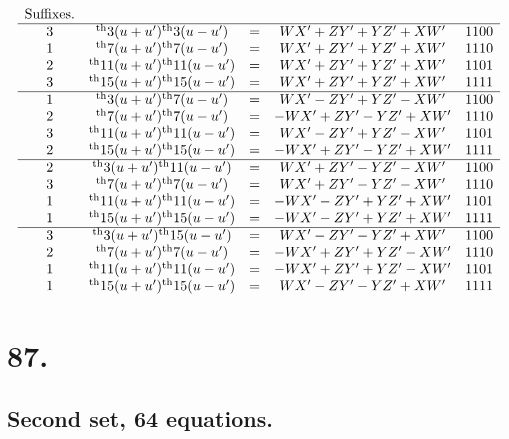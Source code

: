 \documentclass[11pt,a4paper]{book}
\providecommand{\uth}{\textsuperscript{th}}
\begin{document}
\[
\begin{array}{ccccc}
\text{Suffixes.} & & & & \\
\hline
3 & \uth{3}(u+u')\uth{3}(u-u') &=& WX' + ZY' + YZ' + XW' & 1100 \\
1 & \uth{7}(u+u')\uth{7}(u-u') &=& WX' + ZY' + YZ' + XW' & 1110 \\
2 & \uth{11}(u+u')\uth{11}(u-u') &=& WX' + ZY' + YZ' + XW' & 1101 \\
3 & \uth{15}(u+u')\uth{15}(u-u') &=& WX' + ZY' + YZ' + XW' & 1111 \\
\hline
1 & \uth{3}(u+u')\uth{7}(u-u') &=& WX' - ZY' + YZ' - XW' & 1100 \\
2 & \uth{7}(u+u')\uth{7}(u-u') &=& -WX' + ZY' - YZ' + XW' & 1110 \\
3 & \uth{11}(u+u')\uth{11}(u-u') &=& WX' - ZY' + YZ' - XW' & 1101 \\
2 & \uth{15}(u+u')\uth{15}(u-u') &=& -WX' + ZY' - YZ' + XW' & 1111 \\
\hline
2 & \uth{3}(u+u')\uth{11}(u-u') &=& WX' + ZY' - YZ' - XW' & 1100 \\
3 & \uth{7}(u+u')\uth{7}(u-u') &=& WX' + ZY' - YZ' - XW' & 1110 \\
1 & \uth{11}(u+u')\uth{11}(u-u') &=& -WX' - ZY' + YZ' + XW' & 1101 \\
1 & \uth{15}(u+u')\uth{15}(u-u') &=& -WX' - ZY' + YZ' + XW' & 1111 \\
\hline
3 & \uth{3}(u+u')\uth{15}(u-u') &=& WX' - ZY' - YZ' + XW' & 1100 \\
2 & \uth{7}(u+u')\uth{7}(u-u') &=& -WX' + ZY' + YZ' - XW' & 1110 \\
1 & \uth{11}(u+u')\uth{11}(u-u') &=& -WX' + ZY' + YZ' - XW' & 1101 \\
1 & \uth{15}(u+u')\uth{15}(u-u') &=& WX' - ZY' - YZ' + XW' & 1111
\end{array}
\]

\newpage
\section*{87.}
\label{sec:87}

\subsection*{Second set, 64 equations.}
\end{document}
